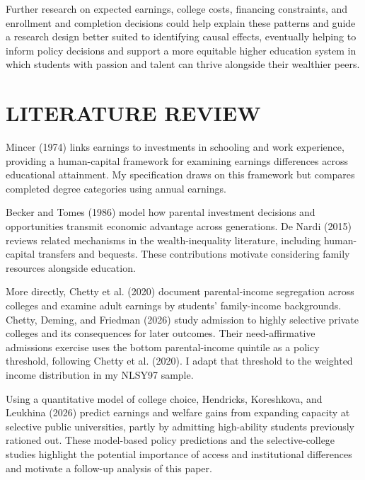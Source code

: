 \documentclass[12pt,letterpaper]{article}
\begin{document}
Further research on expected earnings, college costs, financing constraints, 
and enrollment and completion decisions could help explain these patterns and guide a 
research design better suited to identifying causal effects, eventually helping to inform
policy decisions and support a more equitable higher education system in which students
with passion and talent can thrive alongside their wealthier peers.

\section*{LITERATURE REVIEW}

Mincer (1974) links earnings to investments in schooling and work experience,
providing a human-capital framework for examining earnings differences across
educational attainment. My specification draws on this framework but compares
completed degree categories using annual earnings. \newline

Becker and Tomes (1986) model how parental investment decisions and opportunities
transmit economic advantage across generations. De Nardi (2015) reviews related
mechanisms in the wealth-inequality literature, including human-capital transfers
and bequests. These contributions motivate considering family resources alongside
education. \newline

More directly, Chetty et al. (2020) document parental-income segregation across
colleges and examine adult earnings by students' family-income backgrounds.
Chetty, Deming, and Friedman (2026) study admission to highly selective private
colleges and its consequences for later outcomes. Their need-affirmative admissions
exercise uses the bottom parental-income quintile as a policy threshold, following
Chetty et al. (2020). I adapt that threshold to the weighted income distribution in
my NLSY97 sample. \newline

Using a quantitative model of college choice, Hendricks, Koreshkova, and Leukhina
(2026) predict earnings and welfare gains from expanding capacity at selective
public universities, partly by admitting high-ability students previously rationed
out. These model-based policy predictions and the selective-college studies
highlight the potential importance of access and institutional differences
and motivate a follow-up analysis of this paper.\newline
\end{document}
